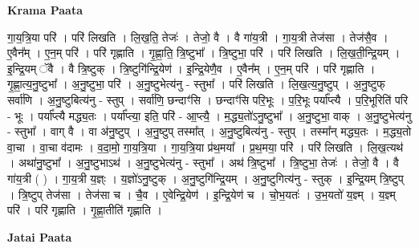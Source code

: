 \documentclass[17pt]{extarticle}
\begin{document}
\textbf{Krama Paata} \newline

गा॒य॒त्रि॒या परि॑ । परि॑ लिखति । लि॒ख॒ति॒ तेजः॑ । तेजो॒ वै । वै गा॑य॒त्री । गा॒य॒त्री तेज॑सा । तेज॑सै॒व । ए॒वैन᳚म् । ए॒न॒म् परि॑ । परि॑ गृह्णाति । गृ॒ह्णा॒ति॒ त्रि॒ष्टुभा᳚ । त्रि॒ष्टुभा॒ परि॑ । परि॑ लिखति । लि॒ख॒ती॒न्द्रि॒यम् । इ॒न्द्रि॒यम् ॅवै । वै त्रि॒ष्टुक् । त्रि॒ष्टुगि॑न्द्रि॒येण॑ । इ॒न्द्रि॒येणै॒व । ए॒वैन᳚म् । ए॒न॒म् परि॑ । परि॑ गृह्णाति । गृ॒ह्णा॒त्य॒नु॒ष्टुभा᳚ । अ॒नु॒ष्टुभा॒ परि॑ । अ॒नु॒ष्टुभेत्य॑नु - स्तुभा᳚ । परि॑ लिखति । लि॒ख॒त्य॒नु॒ष्टुप् । अ॒नु॒ष्टुफ् सर्वा॑णि । अ॒नु॒ष्टुबित्य॑नु - स्तुप् । सर्वा॑णि॒ छन्दाꣳ॑सि । छन्दाꣳ॑सि परि॒भूः । प॒रि॒भूः पर्या᳚प्त्यै । प॒रि॒भूरिति॑ परि - भूः । पर्या᳚प्त्यै मद्ध्य॒तः । पर्या᳚प्त्या॒ इति॒ परि॑ - आ॒प्त्यै॒ । म॒द्ध्य॒तो॑ऽनु॒ष्टुभा᳚ । अ॒नु॒ष्टुभा॒ वाक् । अ॒नु॒ष्टुभेत्य॑नु - स्तुभा᳚ । वाग् वै । वा अ॑नु॒ष्टुप् । अ॒नु॒ष्टुप् तस्मा᳚त् । अ॒नु॒ष्टुबित्य॑नु - स्तुप् । तस्मा᳚न् मद्ध्य॒तः । म॒द्ध्य॒तो वा॒चा । वा॒चा व॑दामः । व॒दा॒मो॒ गा॒य॒त्रि॒या । गा॒य॒त्रि॒या प्र॑थ॒मया᳚ । प्र॒थ॒मया॒ परि॑ । परि॑ लिखति । लि॒ख॒त्यथ॑ । अथा॑नु॒ष्टुभा᳚ । अ॒नु॒ष्टुभाऽथ॑ । अ॒नु॒ष्टुभेत्य॑नु - स्तुभा᳚ । अथ॑ त्रि॒ष्टुभा᳚ । त्रि॒ष्टुभा॒ तेजः॑ । तेजो॒ वै । वै गा॑य॒त्री ( ) । गा॒य॒त्री य॒ज्ञ्ः । य॒ज्ञो॑ऽनु॒ष्टुक् । अ॒नु॒ष्टुगि॑न्द्रि॒यम् । अ॒नु॒ष्टुगित्य॑नु - स्तुक् । इ॒न्द्रि॒यम् त्रि॒ष्टुप् । त्रि॒ष्टुप् तेज॑सा । तेज॑सा च । चै॒व । ए॒वेन्द्रि॒येण॑ । इ॒न्द्रि॒येण॑ च । चो॒भ॒यतः॑ । उ॒भ॒यतो॑ य॒ज्ञ्म् । य॒ज्ञ्म् परि॑ । परि॑ गृह्णाति । गृ॒ह्णा॒तीति॑ गृह्णाति । \newline

\textbf{Jatai Paata} \newline
\end{document}
